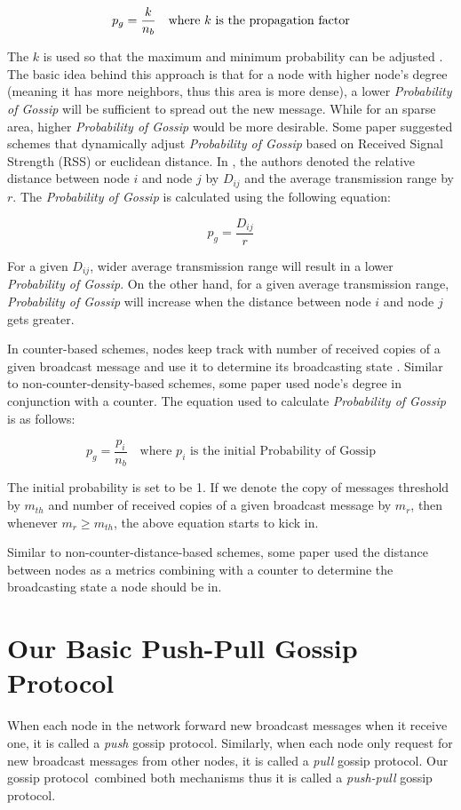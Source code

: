 \documentclass[onehalf,11pt]{beavtex}
\newcommand{\gp}{gossip protocol}
\newcommand{\pog}{Probability of Gossip}
\begin{document}
\[ p_g = \frac{k}{n_b} \mbox{\quad where $k$ is the propagation factor}\]

The $k$ is used so that the maximum and minimum probability can be adjusted \cite{cartigny2003border}. The basic idea behind this approach is that for a node with higher node's degree (meaning it has more neighbors, thus this area is more dense), a lower \emph{\pog} will be sufficient to spread out the new message. While for an sparse area, higher \emph{\pog} would be more desirable. Some paper \cite{qing2010dynamic}\cite{wisitpongphan2007broadcast} suggested schemes that dynamically adjust \emph{\pog} based on Received Signal Strength (RSS) or euclidean distance. In \cite{wisitpongphan2007broadcast}, the authors denoted the relative distance between node $i$ and node $j$ by $D_{ij}$ and the average transmission range by $r$. The \emph{\pog} is calculated using the following equation:

\[ p_g = \frac{D_{ij}}{r}\]

For a given $D_{ij}$, wider average transmission range will result in a lower \emph{\pog}. On the other hand, for a given average transmission range, \emph{\pog} will increase when the distance between node $i$ and node $j$ gets greater.

In counter-based schemes, nodes keep track with number of received copies of a given broadcast message and use it to determine its broadcasting state \cite{2015survey}. Similar to non-counter-density-based schemes, some paper \cite{lee2010adaptive} used node's degree in conjunction with a counter. The equation used to calculate \emph{\pog} is as follows:

\[ p_g = \frac{p_i}{n_b} \quad \mbox{where } p_i \mbox{ is the initial \pog}\]

The initial probability is set to be 1. If we denote the copy of messages threshold by $m_{th}$ and number of received copies of a given broadcast message by $m_r$, then whenever $m_r \geq m_{th}$, the above equation starts to kick in.

Similar to non-counter-distance-based schemes, some paper \cite{khan2008distance}\cite{ling2005coverage} used the distance between nodes as a metrics combining with a counter to determine the broadcasting state a node should be in. 

\section{Our Basic Push-Pull Gossip Protocol} \label{pp}
When each node in the network forward new broadcast messages when it receive one, it is called a \emph{push} \gp. Similarly, when each node only request for new broadcast messages from other nodes, it is called  a \emph{pull} \gp. Our \gp ~combined both mechanisms thus it is called a \emph{push-pull} \gp. 
\end{document}
